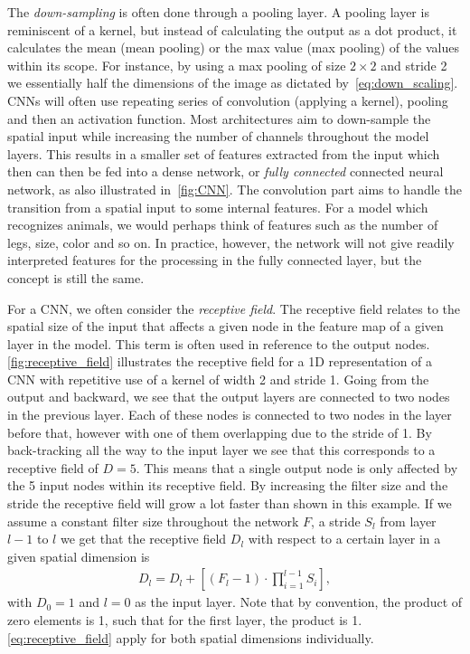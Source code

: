 The
\textit{down-sampling} is often done through a pooling layer. A pooling layer is
reminiscent of a kernel, but instead of calculating the output as a dot product,
it calculates the mean (mean pooling) or the max value (max pooling) of the
values within its scope. For instance, by using a max pooling of size $2 \times
2$ and stride 2 we essentially half the dimensions of the image as dictated
by~\cref{eq:down_scaling}. \acrshort{CNN}s will often use repeating series of
convolution (applying a kernel), pooling and then an activation function. Most
architectures aim to down-sample the spatial input while increasing the number
of channels throughout the model layers. This results in a smaller set of
features extracted from the input which then can then be fed into a dense
network, or \textit{fully connected} connected neural network, as also
illustrated in~\cref{fig:CNN}. The convolution part aims to
handle the transition from a spatial input to some internal features. For a model which recognizes animals, we would perhaps think of features such as the number of legs, size, color and so on. In practice, however, the network will not give readily interpreted features for the processing in the fully connected layer, but the concept is still the same. 



For a \acrshort{CNN}, we often consider the \textit{receptive field}. The receptive field relates to the spatial size of the input that affects a given
node in the feature map of a given layer in the model. This term is often used in reference to the output nodes. \cref{fig:receptive_field} illustrates the
receptive field for a 1D representation of a \acrshort{CNN} with repetitive use
of a kernel of width 2 and stride 1. Going from the output and backward, we see that the output layers are connected to two nodes in the previous layer. Each of these nodes is connected to two nodes in the layer before that, however with one of them overlapping due to the stride of 1. By back-tracking all the way to the input layer we see that this corresponds to a receptive field of $D = 5$. This means that a single output node is only affected by the 5 input nodes within its receptive field. By increasing the filter size and
the stride the receptive field will grow a lot faster than shown in this example. If we assume a constant filter size throughout the network $F$, a stride $S_l$ from layer $l-1$ to $l$ we get that the receptive field $D_l$ with respect to a certain layer in a given spatial dimension is
\begin{align}
    D_l = D_l + \left[(F_l - 1) \cdot \prod_{i=1}^{l-1}S_i \right],
    \label{eq:receptive_field}
\end{align}
with $D_0 = 1$ and $l=0$ as the input layer. Note that by convention, the
product of zero elements is 1, such that for the first layer, the product is 1. \cref{eq:receptive_field} apply for both spatial dimensions individually. 

